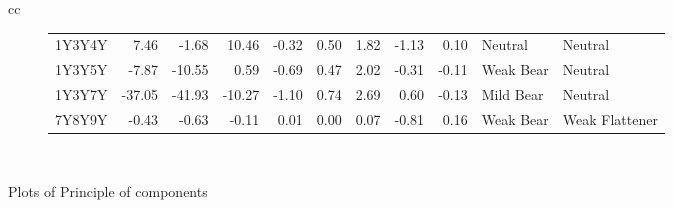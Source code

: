 \documentclass[a4paper,twoside]{report}
\begin{document}
\begin{figure}[htbp]
\begin{tabular}[c]{cc}
\begin{subfigure}[c]{0.5\textwidth}
\begin{adjustbox}{max width=\textwidth}
\begin{tabular}{lrrrrrrrrll}
    1Y3Y4Y &   7.46 &    -1.68 &     10.46 &  -0.32 &  0.50 &      1.82 &  -1.13 &     0.10 &      Neutral &         Neutral \\
    1Y3Y5Y &  -7.87 &   -10.55 &      0.59 &  -0.69 &  0.47 &      2.02 &  -0.31 &    -0.11 &    Weak Bear &         Neutral \\
    1Y3Y7Y & -37.05 &   -41.93 &    -10.27 &  -1.10 &  0.74 &      2.69 &   0.60 &    -0.13 &    Mild Bear &         Neutral \\
    7Y8Y9Y &  -0.43 &    -0.63 &     -0.11 &   0.01 &  0.00 &      0.07 &  -0.81 &     0.16 &    Weak Bear &  Weak Flattener \\
\hline
\end{tabular}
\end{adjustbox}
 \end{subfigure}\\
 
 
 
\end{tabular}
 \caption{Plots of Principle of components}\label{fig:bubble plots}
 \end{figure}  
 
 
 

 
\end{document}
